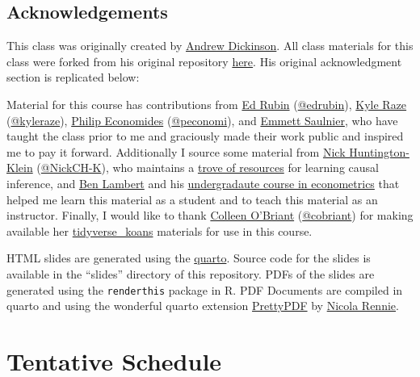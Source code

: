 \documentclass[
  letterpaper,
  DIV=11,
  numbers=noendperiod]{scrartcl}
\begin{document}
\subsection{Acknowledgements}\label{acknowledgements}

This class was originally created by
\href{https://ajdickinson.github.io/}{Andrew Dickinson}. All class
materials for this class were forked from his original repository
\href{https://github.com/ajdickinson/EC320S24}{here}. His original
acknowledgment section is replicated below:

Material for this course has contributions from
\href{http://edrub.in/}{Ed Rubin}
(\href{https://github.com/edrubin}{@edrubin}),
\href{https://kyleraze.com/}{Kyle Raze}
(\href{https://github.com/kyleraze}{@kyleraze}),
\href{https://philip-economides.com/}{Philip Economides}
(\href{https://github.com/peconomi}{@peconomi}), and
\href{https://www.emmettsaulnier.com/}{Emmett Saulnier}, who have taught
the class prior to me and graciously made their work public and inspired
me to pay it forward. Additionally I source some material from
\href{https://nickchk.com/}{Nick Huntington-Klein}
(\href{https://github.com/NickCH-K}{@NickCH-K}), who maintains a
\href{https://nickchk.com/causalgraphs.html}{trove of resources} for
learning causal inference, and
\href{https://ben-lambert.com/econometrics/}{Ben Lambert} and his
\href{.https://www.youtube.com/playlist?list=PLwJRxp3blEvZyQBTTOMFRP_TDaSdly3gU}{undergradaute
course in econometrics} that helped me learn this material as a student
and to teach this material as an instructor. Finally, I would like to
thank \href{https://cobriant.github.io/}{Colleen O'Briant}
(\href{https://github.com/cobriant}{@cobriant}) for making available her
\href{https://github.com/cobriant/tidyverse_koans}{tidyverse\_koans}
materials for use in this course.

HTML slides are generated using the \href{https://quarto.org/}{quarto}.
Source code for the slides is available in the ``slides'' directory of
this repository. PDFs of the slides are generated using the
\texttt{renderthis} package in R. PDF Documents are compiled in quarto
and using the wonderful quarto extension
\href{https://github.com/nrennie/PrettyPDF}{PrettyPDF} by
\href{https://nrennie.rbind.io/}{Nicola Rennie}.

\clearpage

\section{Tentative Schedule}\label{tentative-schedule}
\end{document}
